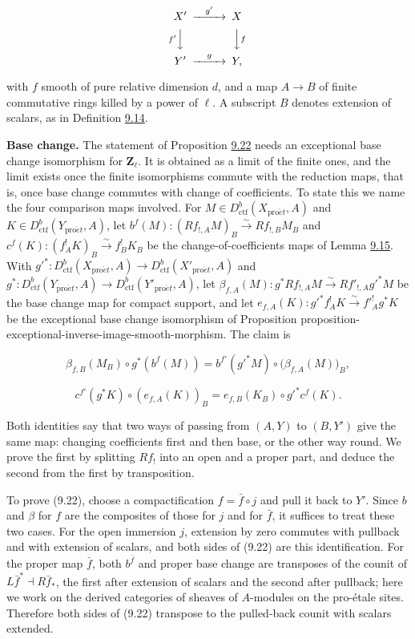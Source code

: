 \documentclass[11pt]{article}
\begin{document}
\[
\begin{CD}
X' @>{g'}>> X\\
@V{f'}VV @VV{f}V\\
Y' @>{g}>> Y,
\end{CD}
\]

with \(f\) smooth of pure relative dimension \(d\), and a map \(A\to B\) of finite commutative rings killed by a power of \(\ell\). A subscript \(B\) denotes extension of scalars, as in Definition \hyperref[bp45]{9.14}.

\textbf{Base change.} The statement of Proposition \hyperref[bp76]{9.22} needs an exceptional base change isomorphism for \(\mathbf Z_\ell\). It is obtained as a limit of the finite ones, and the limit exists once the finite isomorphisms commute with the reduction maps, that is, once base change commutes with change of coefficients. To state this we name the four comparison maps involved. For \(M\in D^b_{\mathrm{ctf}}(X_{\mathrm{pro}\acute{e}t},A)\) and \(K\in D^b_{\mathrm{ctf}}(Y_{\mathrm{pro}\acute{e}t},A)\), let \(b^f(M):(Rf_{!,A}M)_B\xrightarrow{\sim}Rf_{!,B}M_B\) and \(c^f(K):(f_A^!K)_B\xrightarrow{\sim}f_B^!K_B\) be the change-of-coefficients maps of Lemma \hyperref[bp47]{9.15}. With \(g'^*:D^b_{\mathrm{ctf}}(X_{\mathrm{pro}\acute{e}t},A)\to D^b_{\mathrm{ctf}}(X'_{\mathrm{pro}\acute{e}t},A)\) and \(g^*:D^b_{\mathrm{ctf}}(Y_{\mathrm{pro}\acute{e}t},A)\to D^b_{\mathrm{ctf}}(Y'_{\mathrm{pro}\acute{e}t},A)\), let \(\beta_{f,A}(M):g^*Rf_{!,A}M\xrightarrow{\sim}Rf'_{!,A}g'^*M\) be the base change map for compact support, and let \(e_{f,A}(K):g'^*f_A^!K\xrightarrow{\sim}f'^!_Ag^*K\) be the exceptional base change isomorphism of Proposition proposition-exceptional-inverse-image-smooth-morphism. The claim is

\[
\beta_{f,B}(M_B)\circ g^*(b^f(M))
=b^{f'}(g'^*M)\circ\bigl(\beta_{f,A}(M)\bigr)_B,
\tag{9.22}
\]

\[
c^{f'}(g^*K)\circ(e_{f,A}(K))_B
=e_{f,B}(K_B)\circ g'^*c^f(K).
\tag{9.23}
\]

Both identities say that two ways of passing from \((A,Y)\) to \((B,Y')\) give the same map: changing coefficients first and then base, or the other way round. We prove the first by splitting \(Rf_!\) into an open and a proper part, and deduce the second from the first by transposition.

To prove (9.22), choose a compactification \(f=\bar f\circ j\) and pull it back to \(Y'\). Since \(b\) and \(\beta\) for \(f\) are the composites of those for \(j\) and for \(\bar f\), it suffices to treat these two cases. For the open immersion \(j\), extension by zero commutes with pullback and with extension of scalars, and both sides of (9.22) are this identification. For the proper map \(\bar f\), both \(b^{\bar f}\) and proper base change are transposes of the counit of \(L\bar f^*\dashv R\bar f_*\), the first after extension of scalars and the second after pullback; here we work on the derived categories of sheaves of \(A\)-modules on the pro-étale sites. Therefore both sides of (9.22) transpose to the pulled-back counit with scalars extended.
\end{document}
